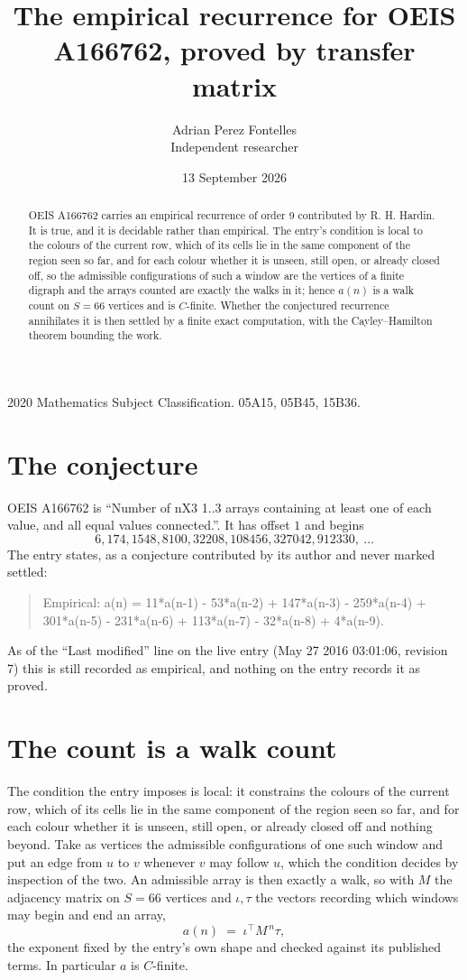 \documentclass[11pt,a4paper]{article}
\title{The empirical recurrence for OEIS A166762, proved by transfer matrix}
\author{Adrian Perez Fontelles\\ \small Independent researcher}
\date{13 September 2026}
\theoremstyle{plain}
\theoremstyle{definition}
\begin{document}
\maketitle

\begin{abstract}
OEIS A166762 carries an empirical recurrence of order $9$ contributed by R. H. Hardin. It is
true, and it is decidable rather than empirical. The entry's condition is local to the colours of the current row, which of its cells lie in the same component of the region seen so far, and for each colour whether it is unseen, still open, or already closed off, so
the admissible configurations of such a window are the vertices of a finite digraph and the
arrays counted are exactly the walks in it; hence $a(n)$ is a walk count on $S=66$ vertices
and is $C$-finite. Whether the conjectured recurrence annihilates it is then settled by a
finite exact computation, with the Cayley--Hamilton theorem bounding the work.
\end{abstract}

\noindent\small 2020 Mathematics Subject Classification. 05A15, 05B45, 15B36.\normalsize

\section{The conjecture}

OEIS A166762 is ``Number of nX3 1..3 arrays containing at least one of each value, and all equal values connected.''. It has offset $1$ and begins
\[
6, 174, 1548, 8100, 32208, 108456, 327042, 912330,\ \dots
\]
The entry states, as a conjecture contributed by its author and never marked settled:
\begin{quote}
Empirical: a(n) = 11*a(n-1) - 53*a(n-2) + 147*a(n-3) - 259*a(n-4) + 301*a(n-5) - 231*a(n-6) + 113*a(n-7) - 32*a(n-8) + 4*a(n-9).
\end{quote}
As of the ``Last modified'' line on the live entry (May 27 2016 03:01:06, revision 7) this is still
recorded as empirical, and nothing on the entry records it as proved.

\section{The count is a walk count}

The condition the entry imposes is local: it constrains the colours of the current row, which of its cells lie in the same component of the region seen so far, and for each colour whether it is unseen, still open, or already closed off and nothing beyond. Take as
vertices the admissible configurations of one such window and put an edge from $u$ to $v$
whenever $v$ may follow $u$, which the condition decides by inspection of the two. An
admissible array is then exactly a walk, so with $M$ the adjacency matrix on $S=66$ vertices
and $\iota,\tau$ the vectors recording which windows may begin and end an array,
\[
a(n)\;=\;\iota^{\!\top}M^{\,n}\tau ,
\]
the exponent fixed by the entry's own shape and checked against its published terms. In
particular $a$ is $C$-finite.
\end{document}
